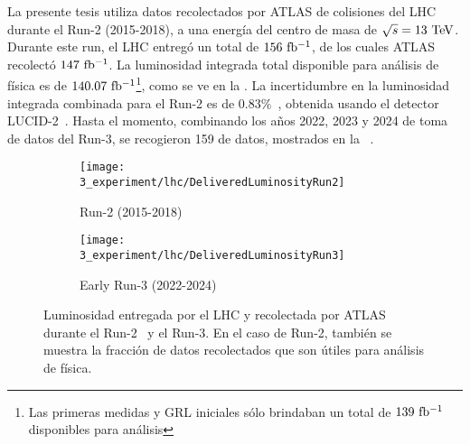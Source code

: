 La presente tesis utiliza datos recolectados por \ac{ATLAS} de colisiones \pp del \ac{LHC} durante el Run-2 (2015-2018), a una energía del centro de masa de \(\sqrt{s} = 13~\tev\). Durante este run, el \ac{LHC} entregó un total de \(156~\ifb\), de los cuales \ac{ATLAS} recolectó \(147~\ifb\). La luminosidad integrada total disponible para análisis de física es de \(140.07~\ifb\)\footnote{Las primeras medidas y \ac{GRL} iniciales sólo brindaban un total de \(139~\ifb\) disponibles para análisis}, como se ve en la \Fig{\ref{fig:atlas:runs:lumi_run2}}. La incertidumbre en la luminosidad integrada combinada para el Run-2 es de \(0.83\%\)~\cite{ATLAS-Lumi-Run2}, obtenida usando el detector LUCID-2~\cite{ATLAS-LUCID2}.
Hasta el momento, combinando los años 2022, 2023 y 2024 de toma de datos del Run-3, se recogieron 159 \ifb de datos, mostrados en la \Fig{\ref{fig:atlas:runs:lumi_run3}}~\cite{ATLAS-Lumi-Run3-2022,ATLAS-Lumi-Run3-2023}.

\begin{figure}[ht!]
    \centering
    \begin{subfigure}[h]{0.46\linewidth}
        \centering
        \texttt{[image: 3\_experiment/lhc/DeliveredLuminosityRun2]}
        \caption{Run-2 (2015-2018)}
        \label{fig:atlas:runs:lumi_run2}
    \end{subfigure}
    \hfill
    \begin{subfigure}[h]{0.46\linewidth}
        \centering
        \texttt{[image: 3\_experiment/lhc/DeliveredLuminosityRun3]}
        \caption{Early Run-3 (2022-2024)}
        \label{fig:atlas:runs:lumi_run3}
    \end{subfigure}
    \caption{Luminosidad entregada por el \ac{LHC} y recolectada por \ac{ATLAS} durante el Run-2~\cite{ATLAS-Lumi-Run2} y el Run-3. En el caso de Run-2, también se muestra la fracción de datos recolectados que son \'utiles para análisis de física.}
    \label{fig:atlas:runs:lumi}
\end{figure}

